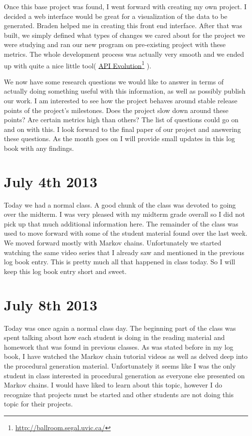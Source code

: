 \documentclass[conference]{IEEEtran}
\newcommand\fnurl[2]{%
  \href{#2}{#1}\footnote{\url{#2}}%
}
\begin{document}
Once this base project was found, I went forward with creating my own project. I decided a web interface would be
great for a visualization of the data to be generated. Braden helped me in creating this front end interface. After
that was built, we simply defined what types of changes we cared about for the project we were studying and ran our
new program on pre-existing project with these metrics. The whole development process was actually very smooth and
we ended up with quite a nice little tool(\fnurl{API Evolution}{http://ballroom.segal.uvic.ca/}). 

We now have some research questions we would like to answer in terms of actually doing something useful with this
information, as well as possibly publish our work. I am interested to see how the project behaves around stable release
points of the project's milestones. Does the project slow down around these points? Are certain metrics high than others?
The list of questions could go on and on with this. I look forward to the final paper of our project and answering
these questions. As the month goes on I will provide small updates in this log book with any findings.

\section{July 4th 2013}
Today we had a normal class. A good chunk of the class was devoted to going over the midterm. I was very pleased
with my midterm grade overall so I did not pick up that much additional information here. The remainder of the class
was used to move forward with some of the student material found over the last week. We moved forward mostly with
Markov chains. Unfortunately we started watching the same video series that I already saw and mentioned in the previous
log book entry. This is pretty much all that happened in class today. So I will keep this log book entry short and sweet.

\section{July 8th 2013}
Today was once again a normal class day. The beginning part of the class was spent talking about how each student is
doing in the reading material and homework that was found in previous classes. As was stated before in my log book,
I have watched the Markov chain tutorial videos as well as delved deep into the procedural generation material. Unfortunately
it seems like I was the only student in class interested in procedural generation as everyone else presented on Markov
chains. I would have liked to learn about this topic, however I do recognize that projects must be started and 
other students are not doing this topic for their projects.
\end{document}
